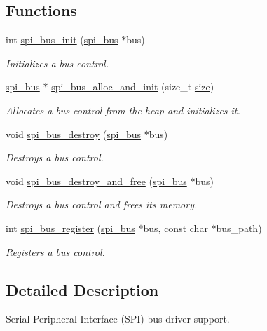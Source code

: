 \subsection*{Functions}
\begin{DoxyCompactItemize}
\item 
int \mbox{\hyperlink{group__SPI_ga262496c8e444706de1774f57e65fb783}{spi\+\_\+bus\+\_\+init}} (\mbox{\hyperlink{structspi__bus}{spi\+\_\+bus}} $\ast$bus)
\begin{DoxyCompactList}\small\item\em Initializes a bus control. \end{DoxyCompactList}\item 
\mbox{\hyperlink{structspi__bus}{spi\+\_\+bus}} $\ast$ \mbox{\hyperlink{group__SPI_ga009e374a9df42c65a879677a4434ed49}{spi\+\_\+bus\+\_\+alloc\+\_\+and\+\_\+init}} (size\+\_\+t \mbox{\hyperlink{sun4u_2tte_8h_a245260f6f74972558f61b85227df5aae}{size}})
\begin{DoxyCompactList}\small\item\em Allocates a bus control from the heap and initializes it. \end{DoxyCompactList}\item 
void \mbox{\hyperlink{group__SPI_ga6d316300e2bb231728d32b5dda355dcd}{spi\+\_\+bus\+\_\+destroy}} (\mbox{\hyperlink{structspi__bus}{spi\+\_\+bus}} $\ast$bus)
\begin{DoxyCompactList}\small\item\em Destroys a bus control. \end{DoxyCompactList}\item 
void \mbox{\hyperlink{group__SPI_ga6c6868bad5d8e9ea136b23947dd9a7a6}{spi\+\_\+bus\+\_\+destroy\+\_\+and\+\_\+free}} (\mbox{\hyperlink{structspi__bus}{spi\+\_\+bus}} $\ast$bus)
\begin{DoxyCompactList}\small\item\em Destroys a bus control and frees its memory. \end{DoxyCompactList}\item 
int \mbox{\hyperlink{group__SPI_ga4e6ca0b1d473a6be4fbbefa2ed1a55f2}{spi\+\_\+bus\+\_\+register}} (\mbox{\hyperlink{structspi__bus}{spi\+\_\+bus}} $\ast$bus, const char $\ast$bus\+\_\+path)
\begin{DoxyCompactList}\small\item\em Registers a bus control. \end{DoxyCompactList}\end{DoxyCompactItemize}


\subsection{Detailed Description}
Serial Peripheral Interface (S\+PI) bus driver support. 



